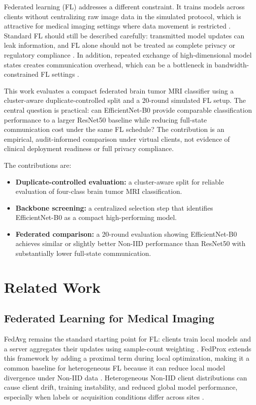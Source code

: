 \documentclass[conference]{IEEEtran}
\begin{document}
Federated learning (FL) addresses a different constraint. It trains models across clients without centralizing raw image data in the simulated protocol, which is attractive for medical imaging settings where data movement is restricted \cite{rieke2020future,sharma2025privacy,mastoi2025explainable}. Standard FL should still be described carefully: transmitted model updates can leak information, and FL alone should not be treated as complete privacy or regulatory compliance \cite{rieke2020future,naseer2026medfl}. In addition, repeated exchange of high-dimensional model states creates communication overhead, which can be a bottleneck in bandwidth-constrained FL settings \cite{mcmahan2017fedavg,radhika2026communication,zhou2022communication}.

This work evaluates a compact federated brain tumor MRI classifier using a cluster-aware duplicate-controlled split and a 20-round simulated FL setup. The central question is practical: can EfficientNet-B0 provide comparable classification performance to a larger ResNet50 baseline while reducing full-state communication cost under the same FL schedule? The contribution is an empirical, audit-informed comparison under virtual clients, not evidence of clinical deployment readiness or full privacy compliance.

The contributions are:
\begin{itemize}
    \raggedright
    \setlength{\itemsep}{0.15em}
    \setlength{\parsep}{0pt}
    \item \textbf{Duplicate-controlled evaluation:} a cluster-aware split for reliable evaluation of four-class brain tumor MRI classification.
    \item \textbf{Backbone screening:} a centralized selection step that identifies EfficientNet-B0 as a compact high-performing model.
    \item \textbf{Federated comparison:} a 20-round evaluation showing EfficientNet-B0 achieves similar or slightly better Non-IID performance than ResNet50 with substantially lower full-state communication.
\end{itemize}

\section{Related Work}
\subsection{Federated Learning for Medical Imaging}
FedAvg remains the standard starting point for FL: clients train local models and a server aggregates their updates using sample-count weighting \cite{mcmahan2017fedavg}. FedProx extends this framework by adding a proximal term during local optimization, making it a common baseline for heterogeneous FL because it can reduce local model divergence under Non-IID data \cite{li2020fedprox,ghanta2025federated}. Heterogeneous Non-IID client distributions can cause client drift, training instability, and reduced global model performance, especially when labels or acquisition conditions differ across sites \cite{ghanta2025federated,xu2023federated,naseer2026medfl}.
\end{document}
